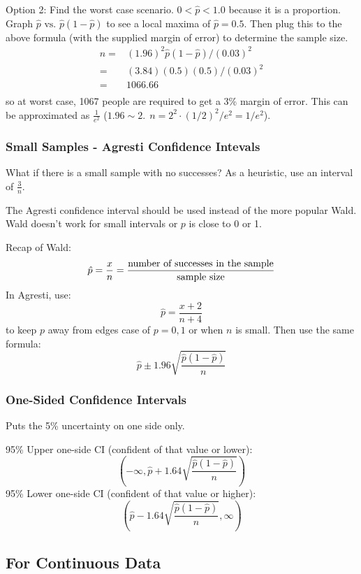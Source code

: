 \documentclass[11pt, oneside]{article}   	%
\begin{document}
Option 2: Find the worst case scenario.
$0 < \hat{p} < 1.0$ because it is a proportion. Graph $\hat{p} \text{ vs. } \hat{p}(1-\hat{p})$ to see a local maxima of $\hat{p} = 0.5$. Then plug this to the above formula (with the supplied margin of error) to determine the sample size.
\begin{align*}
n =& (1.96)^2\hat{p}(1-\hat{p}) / (0.03)^2 \\
   =& (3.84)(0.5)(0.5) / (0.03)^2 \\
   =& 1066.66 \\
\end{align*}
so at worst case, 1067 people are required to get a 3\% margin of error. This can be approximated as $\frac{1}{e^2}$ ($1.96 \sim 2. \ \ n = 2^2\cdot (1/2)^2 / e^2 = 1/e^2$). 


\subsubsection{Small Samples - Agresti Confidence Intevals}

What if there is a small sample with no successes? As a heuristic, use an interval of $\frac{3}{n}$.

The Agresti confidence interval should be used instead of the more popular Wald. Wald doesn't work for small intervals or $p$ is close to 0 or 1.

Recap of Wald:\\
\[
\hat{p} = \frac{x}{n} = \frac{\text{number of successes in the sample}}{\text{sample size}}\\
\]
In Agresti, use:
\[
\hat{p} = \frac{x+2} {n+4}
\]
to keep $p$ away from edges case of $p = 0, 1$ or when $n$ is small.
Then use the same formula:
\[
\hat{p} \pm 1.96 \sqrt{\frac{\hat{p}(1-\hat{p}) } {n} }
\]

\subsubsection{One-Sided Confidence Intervals}

Puts the 5\% uncertainty on one side only.

95\% Upper one-side CI (confident of that value or lower):
\[
(-\infty, \hat{p} + 1.64 \sqrt{\frac{\hat{p}(1-\hat{p}) } {n} } )
\]
95\% Lower one-side CI (confident of that value or higher):
\[
(\hat{p} - 1.64 \sqrt{\frac{\hat{p}(1-\hat{p}) } {n} } , \infty)
\]

\subsection{For Continuous Data}
\end{document}
